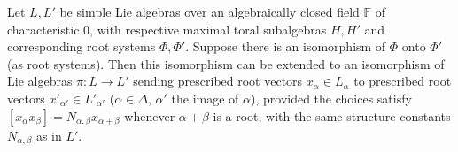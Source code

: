 Let $L, L'$ be simple Lie algebras over an algebraically closed field $\mathbb{F}$ of characteristic $0$, with respective maximal toral subalgebras $H, H'$ and corresponding root systems $\Phi, \Phi'$. Suppose there is an isomorphism of $\Phi$ onto $\Phi'$ (as root systems). Then this isomorphism can be extended to an isomorphism of Lie algebras $\pi: L \to L'$ sending prescribed root vectors $x_\alpha \in L_\alpha$ to prescribed root vectors $x'_{\alpha'} \in L'_{\alpha'}$ ($\alpha \in \Delta$, $\alpha'$ the image of $\alpha$), provided the choices satisfy $[x_\alpha x_\beta] = N_{\alpha,\beta} x_{\alpha+\beta}$ whenever $\alpha+\beta$ is a root, with the same structure constants $N_{\alpha,\beta}$ as in $L'$.